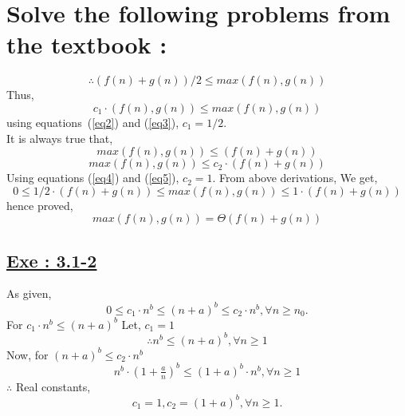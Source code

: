 \documentclass[a4paper, 11pt]{article}
\begin{document}
\section{Solve the following problems from the textbook :}


\begin{equation}
\label{eq2}
\therefore (f(n)+g(n))/2 \leq max(f(n),g(n))
\end{equation}
Thus, 
\begin{equation}
\label{eq3}
c_{1}\cdot(f(n),g(n)) \leq max(f(n),g(n))
\end{equation}
using equations~(\ref{eq2}) and (\ref{eq3}), $c_{1} = 1/2$.\\
It is always true that,\\
\begin{equation}
\label{eq4}
max(f(n),g(n)) \leq (f(n)+g(n))
\end{equation}
\begin{equation}
\label{eq5}
max(f(n),g(n)) \leq c_{2}\cdot(f(n)+g(n))
\end{equation}
Using equations (\ref{eq4}) and (\ref{eq5}), $c_{2} = 1.$\newline
From above derivations, We get,
$$0\le 1/2\cdot(f(n)+g(n)) \leq max(f(n),g(n)) \leq 1\cdot(f(n)+g(n))$$
hence proved, $$max(f(n),g(n)) = \Theta(f(n)+g(n))$$


\subsection*{\underline{Exe : 3.1-2}}
As given,
$$0 \le c_{1}\cdot n^b \le (n+a)^b \le c_{2}\cdot n^b,\forall n\ge n_{0}.$$
For $c_{1}\cdot n^b \le (n+a)^b$\newline
Let, $c_{1}=1$
$$\therefore n^b \le (n+a)^b, \forall n \ge 1$$
Now, for $(n+a)^b \le c_{2}\cdot n^b$
$$n^b \cdot (1+\tfrac{a}{n})^b \le (1+a)^b \cdot n^b,\forall n \ge 1$$   
$\therefore$ Real constants,
$$c_{1}=1, c_{2}=(1+a)^b , \forall n \ge 1.$$
\end{document}
